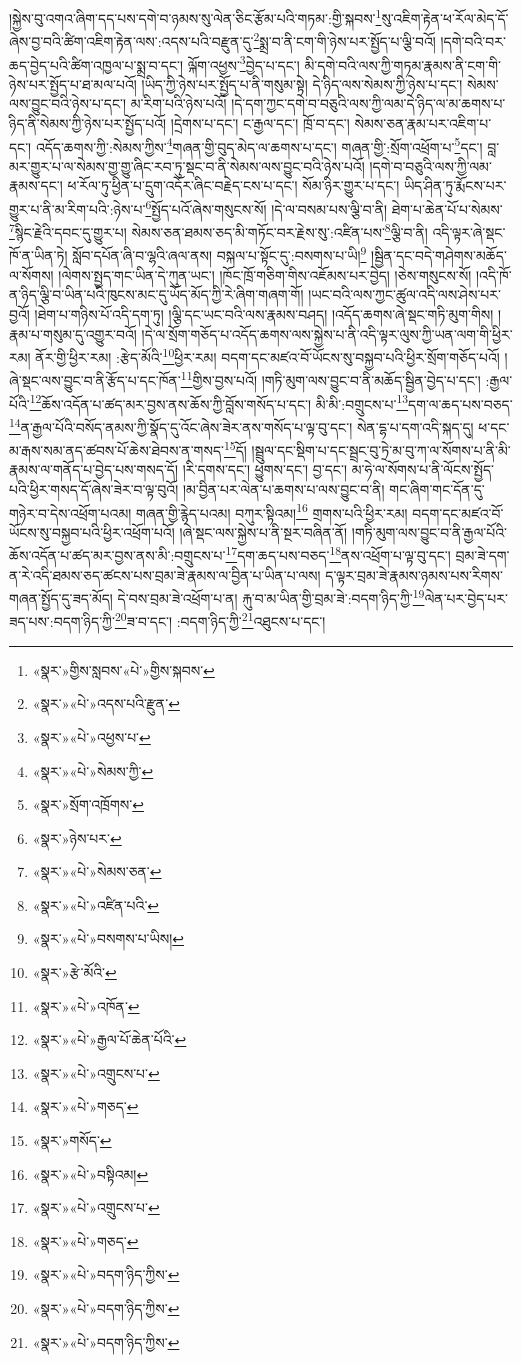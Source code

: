 །སྐྱེས་བུ་འགའ་ཞིག་དད་པས་དགེ་བ་ཉམས་སུ་ལེན་ཅིང་རྩོམ་པའི་གཏམ་:གྱི་སྐབས་\footnote{«སྣར་»གྱིས་སླབས་«པེ་»གྱིས་སྐབས་}སུ་འཇིག་རྟེན་ཕ་རོལ་མེད་དོ་ཞེས་བྱ་བའི་ཚིག་འཇིག་རྟེན་ལས་:འདས་པའི་བརྫུན་དུ་\footnote{«སྣར་»«པེ་»འདས་པའི་རྫུན་}སྨྲ་བ་ནི་ངག་གི་ཉེས་པར་སྤྱོད་པ་ལྕི་བའོ། །དགེ་བའི་བར་ཆད་བྱེད་པའི་ཚིག་འཁྱལ་པ་སྨྲ་བ་དང་། ལྐོག་འཕྱས་\footnote{«སྣར་»«པེ་»འཕྱས་པ་}བྱེད་པ་དང་། མི་དགེ་བའི་ལས་ཀྱི་གཏམ་རྣམས་ནི་ངག་གི་ཉེས་པར་སྤྱོད་པ་ཐ་མལ་པའོ། །ཡིད་ཀྱི་ཉེས་པར་སྤྱོད་པ་ནི་གསུམ་སྟེ། དེ་ཉིད་ལས་སེམས་ཀྱི་ཉེས་པ་དང་། སེམས་ལས་བྱུང་བའི་ཉེས་པ་དང་། མ་རིག་པའི་ཉེས་པའོ། །དེ་དག་ཀྱང་དགེ་བ་བཅུའི་ལས་ཀྱི་ལམ་དེ་ཉིད་ལ་མ་ཆགས་པ་ཉིད་ནི་སེམས་ཀྱི་ཉེས་པར་སྤྱོད་པའོ། །དྲེགས་པ་དང་། ང་རྒྱལ་དང་། ཁྲོ་བ་དང་། སེམས་ཅན་རྣམ་པར་འཇིག་པ་དང་། འདོད་ཆགས་ཀྱི་:སེམས་ཀྱིས་\footnote{«སྣར་»«པེ་»སེམས་ཀྱི་}གཞན་གྱི་བུད་མེད་ལ་ཆགས་པ་དང་། གཞན་གྱི་:སྲོག་འཕྲོག་པ་\footnote{«སྣར་»སྲོག་འཁྲོགས་}དང་། བླ་མར་གྱུར་པ་ལ་སེམས་གྱ་གྱུ་ཞིང་རབ་ཏུ་སྡང་བ་ནི་སེམས་ལས་བྱུང་བའི་ཉེས་པའོ། །དགེ་བ་བཅུའི་ལས་ཀྱི་ལམ་རྣམས་དང་། ཕ་རོལ་ཏུ་ཕྱིན་པ་དྲུག་འདོར་ཞིང་བརྗེད་ངས་པ་དང་། སོམ་ཉིར་གྱུར་པ་དང་། ཡིད་ཤིན་ཏུ་རྨོངས་པར་གྱུར་པ་ནི་མ་རིག་པའི་:ཉེས་པ་\footnote{«སྣར་»ཉེས་པར་}སྤྱོད་པའོ་ཞེས་གསུངས་སོ། །དེ་ལ་བསམ་པས་ལྕི་བ་ནི། ཐེག་པ་ཆེན་པོ་པ་སེམས་\footnote{«སྣར་»«པེ་»སེམས་ཅན་}སྙིང་རྗེའི་དབང་དུ་གྱུར་པ། སེམས་ཅན་ཐམས་ཅད་མི་གཏོང་བར་རྗེས་སུ་:འཛིན་པས་\footnote{«སྣར་»«པེ་»འཛིན་པའི་}ལྕི་བ་ནི། འདི་ལྟར་ཞེ་སྡང་ཁོ་ན་ཡིན་ཏེ། སློབ་དཔོན་ཞི་བ་ལྷའི་ཞལ་ནས། བསྐལ་པ་སྟོང་དུ་:བསགས་པ་ཡི།\footnote{«སྣར་»«པེ་»བསགས་པ་ཡིས།} །སྦྱིན་དང་བདེ་གཤེགས་མཆོད་ལ་སོགས། །ལེགས་སྤྱད་གང་ཡིན་དེ་ཀུན་ཡང་། །ཁོང་ཁྲོ་གཅིག་གིས་འཇོམས་པར་བྱེད། །ཅེས་གསུངས་སོ། །འདི་ཁོ་ན་ཉིད་ལྕི་བ་ཡིན་པའི་ཁུངས་མང་དུ་ཡོད་མོད་ཀྱི་རེ་ཞིག་གཞག་གོ། །ཡང་བའི་ལས་ཀྱང་ཚུལ་འདི་ལས་ཤེས་པར་བྱའོ། །ཐེག་པ་གཉིས་པོ་འདི་དག་ཏུ། །ལྕི་དང་ཡང་བའི་ལས་རྣམས་བཤད། །འདོད་ཆགས་ཞེ་སྡང་གཏི་མུག་གིས། །རྣམ་པ་གསུམ་དུ་འགྱུར་བའོ། །དེ་ལ་སྲོག་གཅོད་པ་འདོད་ཆགས་ལས་སྐྱེས་པ་ནི་འདི་ལྟར་ལུས་ཀྱི་ཡན་ལག་གི་ཕྱིར་རམ། ནོར་གྱི་ཕྱིར་རམ། :རྩེད་མོའི་\footnote{«སྣར་»རྩེ་མོའི་}ཕྱིར་རམ། བདག་དང་མཛའ་བོ་ཡོངས་སུ་བསྐྱབ་པའི་ཕྱིར་སྲོག་གཅོད་པའོ། །ཞེ་སྡང་ལས་བྱུང་བ་ནི་རྩོད་པ་དང་ཁོན་\footnote{«སྣར་»«པེ་»འཁོན་}གྱིས་བྱས་པའོ། །གཏི་མུག་ལས་བྱུང་བ་ནི་མཆོད་སྦྱིན་བྱེད་པ་དང་། :རྒྱལ་པོའི་\footnote{«སྣར་»«པེ་»རྒྱལ་པོ་ཆེན་པོའི་}ཆོས་འདོན་པ་ཚད་མར་བྱས་ནས་ཆོས་ཀྱི་བློས་གསོད་པ་དང་། མི་མི་:བགྲུངས་པ་\footnote{«སྣར་»«པེ་»འགྲུངས་པ་}དག་ལ་ཆད་པས་བཅད་\footnote{«སྣར་»«པེ་»གཅད་}ན་རྒྱལ་པོའི་བསོད་ནམས་ཀྱི་སྣོད་དུ་འོང་ཞེས་ཟེར་ནས་གསོད་པ་ལྟ་བུ་དང་། སེན་དྷ་པ་དག་འདི་སྐད་དུ། ཕ་དང་མ་རྒས་སམ་ནད་ཚབས་པོ་ཆེས་ཐེབས་ན་གསད་\footnote{«སྣར་»གསོད་}དོ། །སྦྲུལ་དང་སྡིག་པ་དང་སྦྲང་བུ་ཏྲེ་མ་བུ་ཀ་ལ་སོགས་པ་ནི་མི་རྣམས་ལ་གནོད་པ་བྱེད་པས་གསད་དོ། །རི་དགས་དང་། ཕྱུགས་དང་། བྱ་དང་། མ་ཧེ་ལ་སོགས་པ་ནི་ལོངས་སྤྱོད་པའི་ཕྱིར་གསད་དོ་ཞེས་ཟེར་བ་ལྟ་བུའོ། །མ་བྱིན་པར་ལེན་པ་ཆགས་པ་ལས་བྱུང་བ་ནི། གང་ཞིག་གང་དོན་དུ་གཉེར་བ་དེས་འཕྲོག་པའམ། གཞན་གྱི་རྙེད་པའམ། བཀུར་སྟིའམ།\footnote{«སྣར་»«པེ་»བསྟིའམ།} གྲགས་པའི་ཕྱིར་རམ། བདག་དང་མཛའ་བོ་ཡོངས་སུ་བསྐྱབ་པའི་ཕྱིར་འཕྲོག་པའོ། །ཞེ་སྡང་ལས་སྐྱེས་པ་ནི་སྔར་བཞིན་ནོ། །གཏི་མུག་ལས་བྱུང་བ་ནི་རྒྱལ་པོའི་ཆོས་འདོན་པ་ཚད་མར་བྱས་ནས་མི་:བགྲུངས་པ་\footnote{«སྣར་»«པེ་»འགྲུངས་པ་}དག་ཆད་པས་བཅད་\footnote{«སྣར་»«པེ་»གཅད་}ནས་འཕྲོག་པ་ལྟ་བུ་དང་། བྲམ་ཟེ་དག་ན་རེ་འདི་ཐམས་ཅད་ཚངས་པས་བྲམ་ཟེ་རྣམས་ལ་བྱིན་པ་ཡིན་པ་ལས། ད་ལྟར་བྲམ་ཟེ་རྣམས་ཉམས་པས་རིགས་གཞན་སྤྱོད་དུ་ཟད་མོད། དེ་བས་བྲམ་ཟེ་འཕྲོག་པ་ན། རྐུ་བ་མ་ཡིན་གྱི་བྲམ་ཟེ་:བདག་ཉིད་ཀྱི་\footnote{«སྣར་»«པེ་»བདག་ཉིད་ཀྱིས་}ལེན་པར་བྱེད་པར་ཟད་པས་:བདག་ཉིད་ཀྱི་\footnote{«སྣར་»«པེ་»བདག་ཉིད་ཀྱིས་}ཟ་བ་དང་། :བདག་ཉིད་ཀྱི་\footnote{«སྣར་»«པེ་»བདག་ཉིད་ཀྱིས་}འཐུངས་པ་དང་། 